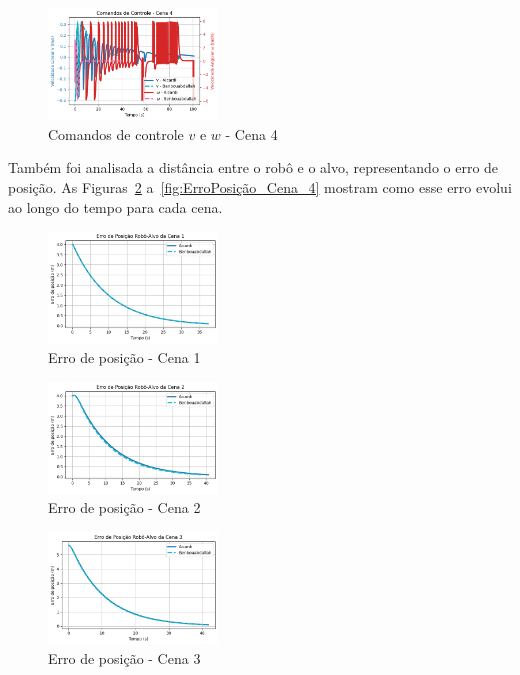 \documentclass[conference]{IEEEtran}
\begin{document}
\begin{figure}[h!]
    \centering
    \includegraphics[width=0.4\textwidth]{Figuras/Controle_Cena_4.png}
    \caption{Comandos de controle $v$ e $w$ - Cena 4}
    \label{fig:Controle_Cena_4}
\end{figure}

Também foi analisada a distância entre o robô e o alvo, representando o erro de posição. As Figuras~\ref{fig:ErroPosição_Cena_1} a~\ref{fig:ErroPosição_Cena_4} mostram como esse erro evolui ao longo do tempo para cada cena.

\begin{figure}[h!]
    \centering
    \includegraphics[width=0.4\textwidth]{Figuras/ErroPosição_Cena_1.png}
    \caption{Erro de posição - Cena 1}
    \label{fig:ErroPosição_Cena_1}
\end{figure}

\begin{figure}[h!]
    \centering
    \includegraphics[width=0.4\textwidth]{Figuras/ErroPosição_Cena_2.png}
    \caption{Erro de posição - Cena 2}
    \label{fig:ErroPosição_Cena_2}
\end{figure}

\begin{figure}[h!]
    \centering
    \includegraphics[width=0.4\textwidth]{Figuras/ErroPosição_Cena_3.png}
    \caption{Erro de posição - Cena 3}
    \label{fig:ErroPosição_Cena_3}
\end{figure}
\end{document}
